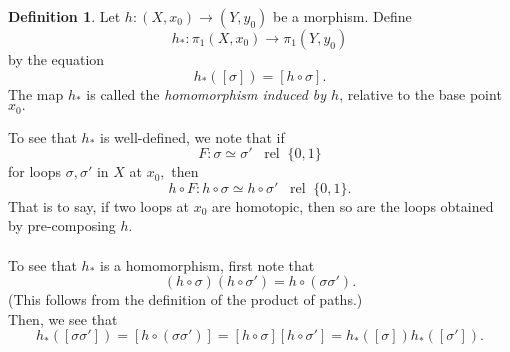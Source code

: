 \documentclass[12pt]{article}
\theoremstyle{definition}
\numberwithin{thm}{section}
\newtheorem{defn}[thm]{Definition}
\newcommand{\rel}{\;\;\operatorname{rel}\;}
\begin{document}
\begin{defn}
	Let $h:(X, x_0) \to (Y, y_0)$ be a morphism. Define
	\begin{equation*} 
		h_* : \pi_1(X, x_0) \to \pi_1(Y, y_0)
	\end{equation*}
	by the equation
	\begin{equation*} 
		h_*([\sigma]) = [h\circ \sigma].
	\end{equation*}
	The map $h_*$ is called the \emph{homomorphism induced by $h$}, relative to the base point $x_0.$
\end{defn}
To see that $h_*$ is well-defined, we note that if 
\begin{equation*} 
	F : \sigma \simeq \sigma' \rel \{0, 1\}
\end{equation*}
for loops $\sigma, \sigma'$ in $X$ at $x_0,$ then
\begin{equation*} 
	h \circ F : h\circ \sigma \simeq h\circ\sigma' \rel \{0, 1\}.
\end{equation*}
That is to say, if two loops at $x_0$ are homotopic, then so are the loops obtained by pre-composing $h.$\\~\\
To see that $h_*$ is a homomorphism, first note that
\begin{equation*} 
	(h \circ \sigma)(h \circ \sigma') = h\circ(\sigma\sigma').
\end{equation*}
(This follows from the definition of the product of paths.)\\
Then, we see that
\begin{equation*} 
	h_*([\sigma\sigma']) = [h\circ(\sigma\sigma')] = [h\circ\sigma][h\circ\sigma'] = h_*([\sigma])h_*([\sigma']).
\end{equation*}
\end{document}
